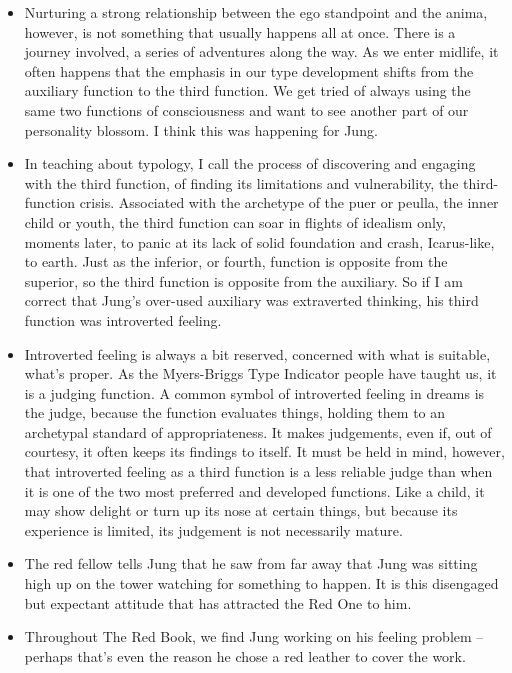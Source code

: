 \begin{itemize}

\item Nurturing a strong relationship between the ego standpoint and the anima,
however, is not something that usually happens all at once. There is a journey
involved, a series of adventures along the way. As we enter midlife, it often
happens that the emphasis in our type development shifts from the auxiliary
function to the third function. We get tried of always using the same two
functions of consciousness and want to see another part of our personality
blossom. I think this was happening for Jung.

\item In teaching about typology, I call the process of discovering and
engaging with the third function, of finding its limitations and vulnerability,
the third-function crisis. Associated with the archetype of the puer or peulla,
the inner child or youth, the third function can soar in flights of idealism
only, moments later, to panic at its lack of solid foundation and crash,
Icarus-like, to earth.  Just as the inferior, or fourth, function is opposite
from the superior, so the third function is opposite from the auxiliary. So if
I am correct that Jung's over-used auxiliary was extraverted thinking, his
third function was introverted feeling.

\item Introverted feeling is always a bit reserved, concerned with what is
suitable, what's proper. As the Myers-Briggs Type Indicator people have taught
us, it is a judging function.  A common symbol of introverted feeling in dreams
is the judge, because the function evaluates things, holding them to an
archetypal standard of appropriateness. It makes judgements, even if, out of
courtesy, it often keeps its findings to itself. It must be held in mind,
however, that introverted feeling as a third function is a less reliable judge
than when it is one of the two most preferred and developed functions. Like a
child, it may show delight or turn up its nose at certain things, but because
its experience is limited, its judgement is not necessarily mature.

\item The red fellow tells Jung that he saw from far away that Jung was sitting
high up on the tower watching for something to happen. It is this disengaged
but expectant attitude that has attracted the Red One to him.

\item Throughout The Red Book, we find Jung working on his feeling problem --
perhaps that's even the reason he chose a red leather to cover the work.


\end{itemize}
